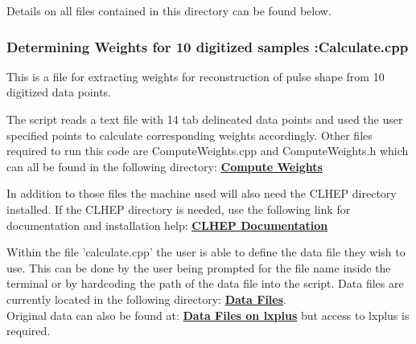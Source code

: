 \documentclass{article}
\begin{document}

Details on all files contained in this directory can be found below.

\subsubsection{Determining Weights for 10 digitized samples :Calculate.cpp}

This is a file for extracting weights for reconstruction of pulse shape from 10 digitized data points. %

\vspace{5mm}

The script reads a text file with 14 tab delineated data points and used the user specified points to calculate corresponding weights accordingly. 
Other files required to run this code are ComputeWeights.cpp and  ComputeWeights.h which can all be found in the following directory:
\href{https://github.com/atishelmanch/ECAL_Weights/tree/Megan/src/ComputeWeights}{\bf{Compute Weights}}

\vspace{5mm}

In addition to those files the machine used will also need the CLHEP directory installed. If the CLHEP directory is needed, use the following link for documentation and installation help: 
\href{http://proj-clhep.web.cern.ch/proj-clhep}{\bf{CLHEP Documentation}}


\vspace{5mm}

Within the file 'calculate.cpp' the user is able to define the data file they wish to use. This can be done by the user being prompted for the file name inside the terminal or by hardcoding the path of the data file into the script. Data files are currently located in the following directory: 
\href{https://github.com/atishelmanch/ECAL_Weights/tree/Megan/Data}{\bf{Data Files}}. 
\\Original data can also be found at: \href{https://github.com/atishelmanch/ECAL_Weights/tree/Megan/Data}{\bf{Data Files on lxplus}} but access to lxplus is required. %
\end{document}
